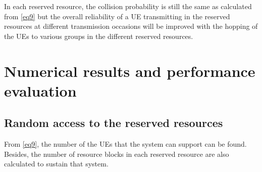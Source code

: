 \documentclass[conference]{IEEEtran}
\begin{document}
In each reserved resource, the collision probability is still the same as calculated from \eqref{eq9} but the overall reliability of a UE transmitting in the reserved resources at different transmission occasions will be improved with the hopping of the UEs to various groups in the different reserved resources.

\section{Numerical results and performance evaluation}\label{III}

\subsection{Random access to the reserved resources}\label{IIIAA}
From \eqref{eq9}, the number of the UEs that the system can support can be found. Besides, the number of resource blocks in each reserved resource are also calculated to sustain that system.
\end{document}
